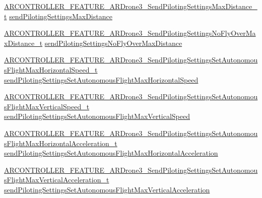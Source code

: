 \begin{DoxyCompactItemize}
\item 
\hyperlink{_a_r_c_o_n_t_r_o_l_l_e_r___feature_8h_a0d066baba27befff7a448416a0051d69}{A\+R\+C\+O\+N\+T\+R\+O\+L\+L\+E\+R\+\_\+\+F\+E\+A\+T\+U\+R\+E\+\_\+\+A\+R\+Drone3\+\_\+\+Send\+Piloting\+Settings\+Max\+Distance\+\_\+t} \hyperlink{struct_a_r_c_o_n_t_r_o_l_l_e_r___f_e_a_t_u_r_e___a_r_drone3__t_ac5bb44bed9ff33e040ff5ab381c11566}{send\+Piloting\+Settings\+Max\+Distance}
\item 
\hyperlink{_a_r_c_o_n_t_r_o_l_l_e_r___feature_8h_a5b2fa9e69bed34193962933dc8c29d03}{A\+R\+C\+O\+N\+T\+R\+O\+L\+L\+E\+R\+\_\+\+F\+E\+A\+T\+U\+R\+E\+\_\+\+A\+R\+Drone3\+\_\+\+Send\+Piloting\+Settings\+No\+Fly\+Over\+Max\+Distance\+\_\+t} \hyperlink{struct_a_r_c_o_n_t_r_o_l_l_e_r___f_e_a_t_u_r_e___a_r_drone3__t_aca1fa59961e583da002fbe236d41c327}{send\+Piloting\+Settings\+No\+Fly\+Over\+Max\+Distance}
\item 
\hyperlink{_a_r_c_o_n_t_r_o_l_l_e_r___feature_8h_ae28bfac1e1bad37383b2b2e12a768f56}{A\+R\+C\+O\+N\+T\+R\+O\+L\+L\+E\+R\+\_\+\+F\+E\+A\+T\+U\+R\+E\+\_\+\+A\+R\+Drone3\+\_\+\+Send\+Piloting\+Settings\+Set\+Autonomous\+Flight\+Max\+Horizontal\+Speed\+\_\+t} \hyperlink{struct_a_r_c_o_n_t_r_o_l_l_e_r___f_e_a_t_u_r_e___a_r_drone3__t_a1c10c8adc7412b83b8638af1862acb85}{send\+Piloting\+Settings\+Set\+Autonomous\+Flight\+Max\+Horizontal\+Speed}
\item 
\hyperlink{_a_r_c_o_n_t_r_o_l_l_e_r___feature_8h_acc93a43228da0f6a2f6dddab03be1f33}{A\+R\+C\+O\+N\+T\+R\+O\+L\+L\+E\+R\+\_\+\+F\+E\+A\+T\+U\+R\+E\+\_\+\+A\+R\+Drone3\+\_\+\+Send\+Piloting\+Settings\+Set\+Autonomous\+Flight\+Max\+Vertical\+Speed\+\_\+t} \hyperlink{struct_a_r_c_o_n_t_r_o_l_l_e_r___f_e_a_t_u_r_e___a_r_drone3__t_a2597f4c6e5964892115706805f058001}{send\+Piloting\+Settings\+Set\+Autonomous\+Flight\+Max\+Vertical\+Speed}
\item 
\hyperlink{_a_r_c_o_n_t_r_o_l_l_e_r___feature_8h_adf393cb48b8c9f7d60f229e2bb55d5bb}{A\+R\+C\+O\+N\+T\+R\+O\+L\+L\+E\+R\+\_\+\+F\+E\+A\+T\+U\+R\+E\+\_\+\+A\+R\+Drone3\+\_\+\+Send\+Piloting\+Settings\+Set\+Autonomous\+Flight\+Max\+Horizontal\+Acceleration\+\_\+t} \hyperlink{struct_a_r_c_o_n_t_r_o_l_l_e_r___f_e_a_t_u_r_e___a_r_drone3__t_a5a59051669157259bfd6687af0bb23cd}{send\+Piloting\+Settings\+Set\+Autonomous\+Flight\+Max\+Horizontal\+Acceleration}
\item 
\hyperlink{_a_r_c_o_n_t_r_o_l_l_e_r___feature_8h_af803aefb4eb362b62874f71d09c5128a}{A\+R\+C\+O\+N\+T\+R\+O\+L\+L\+E\+R\+\_\+\+F\+E\+A\+T\+U\+R\+E\+\_\+\+A\+R\+Drone3\+\_\+\+Send\+Piloting\+Settings\+Set\+Autonomous\+Flight\+Max\+Vertical\+Acceleration\+\_\+t} \hyperlink{struct_a_r_c_o_n_t_r_o_l_l_e_r___f_e_a_t_u_r_e___a_r_drone3__t_a8f8a65d36a0d499802812035cbc77c21}{send\+Piloting\+Settings\+Set\+Autonomous\+Flight\+Max\+Vertical\+Acceleration}

\end{DoxyCompactItemize}
